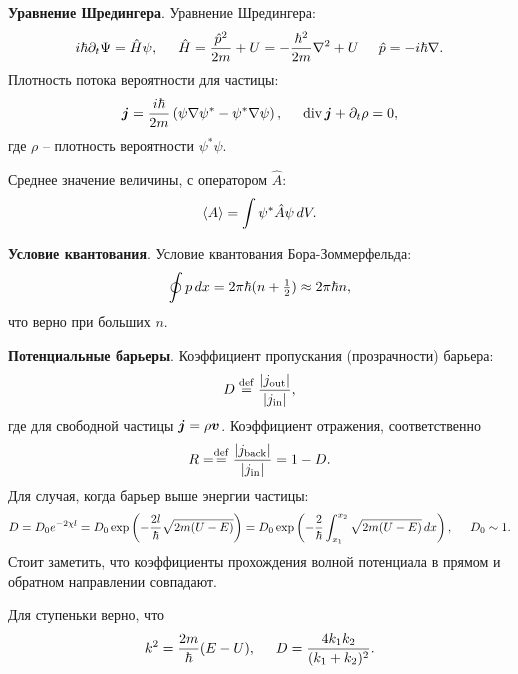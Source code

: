 
\textbf{Уравнение Шредингера}. 
Уравнение Шредингера:
\begin{equation*}
    i \hbar \partial_t \Psi = \hat{H} \psi, 
    \hspace{5 mm} 
    \hat{H} = \frac{\hat{p}^2}{2m} + U = - \frac{\hbar^2}{2m} \nabla^2 + U
    \hspace{5 mm} 
    \hat{p} = - i \hbar \nabla.
\end{equation*}
Плотность потока вероятности  для частицы:
\begin{equation*}
    \mbox{\boldmath $j$} = \frac{i\hbar}{2m} \left(
        \psi \nabla \psi^* - \psi^* \nabla \psi
    \right),
    \hspace{5 mm} 
    \mathop{\mathrm{div}}\nolimits \mbox{\boldmath $j$} + \partial_t \rho = 0,
\end{equation*}
где $\rho$ -- плотность вероятности $\psi^* \psi$. 

Среднее значение величины, с оператором $\hat{A}$:
\begin{equation*}
    \langle A\rangle = \int \psi^* \hat{A} \psi \, d V.
\end{equation*}

\textbf{Условие квантования}. Условие квантования Бора-Зоммерфельда:
\begin{equation*}
    \oint p \, d x = 2 \pi \hbar (n + \tfrac{1}{2}) \approx  2 \pi \hbar n,
\end{equation*}
что верно при больших $n$. 



\textbf{Потенциальные барьеры}. Коэффициент пропускания (прозрачности) барьера:
\begin{equation*}
    D \overset{\mathrm{def}}{=}  \frac{|j_{\textnormal{out}}|}{|j_{\textnormal{in}}|},
\end{equation*}
где для свободной частицы $\mbox{\boldmath $j$} = \rho \mbox{\boldmath $v$}$.  Коэффициент отражения, соответственно
\begin{equation*}
    R = \overset{\mathrm{def}}{=}  \frac{|j_{\textnormal{back}}|}{|j_{\textnormal{in}}|} = 1 - D.
\end{equation*}
Для случая, когда барьер выше энергии частицы:
\begin{equation*}
    D = D_0 e^{- 2 \chi l} = D_0 \exp\left(
        - \frac{2 l}{\hbar} \sqrt{2m (U - E)}
    \right) = 
    D_0 \exp\left(
        - \frac{2}{\hbar} \int\nolimits_{x_1}^{x_2}  \sqrt{2m(U-E)} \, d x
    \right),
    \hspace{5 mm} 
    D_0 \sim 1.
\end{equation*}
Стоит заметить, что коэффициенты прохождения волной потенциала в прямом и обратном направлении совпадают. 

Для ступеньки верно, что
\begin{equation*}
    k^2 = \frac{2m}{\hbar}(E-U),
    \hspace{5 mm} 
    D = \frac{4 k_1 k_2}{(k_1 + k_2)^2}.
\end{equation*}




